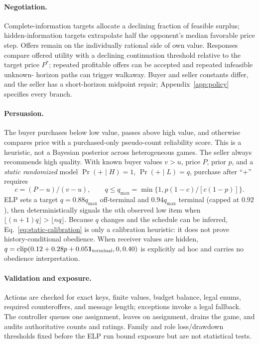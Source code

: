 \paragraph{Negotiation.}
Complete-information targets allocate a declining fraction of feasible surplus;
hidden-information targets extrapolate half the opponent's median favorable
price step. Offers remain on the individually rational side of own value.
Responses compare offered utility with a declining continuation threshold
relative to the target price $P^*$;
repeated profitable offers can be accepted and repeated infeasible unknown-
horizon paths can trigger walkaway. Buyer and seller constants differ, and the
seller has a short-horizon midpoint repair; Appendix~\ref{app:policy} specifies
every branch.

\paragraph{Persuasion.}
The buyer purchases below low value, passes above high value, and otherwise
compares price with a purchased-only pseudo-count reliability score. This is a
heuristic, not a Bayesian posterior across heterogeneous games. The seller always
recommends high quality. With known buyer values $v>u$, price $P$, prior $p$,
and a \emph{static randomized} model $\Pr(+\mid H)=1$,
$\Pr(+\mid L)=q$, purchase after ``+'' requires
\begin{equation}
 c=(P-u)/(v-u),\qquad
 q\le q_{\max}=\min\{1,p(1-c)/[c(1-p)]\}.
 \label{eq:static-calibration}
\end{equation}
ELP sets a target $q=0.88q_{\max}$ off-terminal and $0.94q_{\max}$ terminal
(capped at $0.92$), then deterministically signals the $n$th observed low item
when $\lfloor(n+1)q\rfloor>\lfloor nq\rfloor$. Because $q$ changes and the
schedule can be inferred, Eq.~\ref{eq:static-calibration} is only a calibration
heuristic: it does not prove history-conditional obedience. When receiver values
are hidden, $q=\operatorname{clip}(0.12+0.28p+0.05\mathbf{1}_{\rm terminal},0,0.40)$
is explicitly ad hoc and carries no obedience interpretation.

\paragraph{Validation and exposure.}
Actions are checked for exact keys, finite values, budget balance, legal enums,
required counteroffers, and message length; exceptions invoke a legal fallback.
The controller queues one assignment, leaves on assignment, drains the game,
and audits authoritative counts and ratings. Family and role loss/drawdown
thresholds fixed before the ELP run bound exposure but are not statistical tests.
